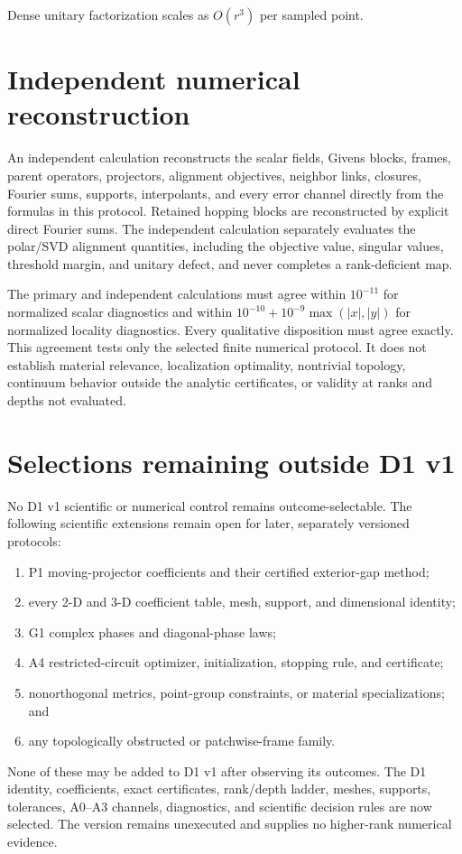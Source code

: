 \documentclass[11pt]{article}
\begin{document}
Dense unitary factorization scales as $O(r^3)$ per sampled point.

\section{Independent numerical reconstruction}

An independent calculation reconstructs the scalar fields, Givens blocks, frames,
parent operators, projectors, alignment objectives, neighbor links, closures, Fourier
sums, supports, interpolants, and every error channel directly from the formulas in this
protocol. Retained hopping blocks are reconstructed by explicit direct Fourier sums.
The independent calculation separately evaluates the polar/SVD alignment quantities,
including the objective value, singular values, threshold margin, and unitary defect,
and never completes a rank-deficient map.

The primary and independent calculations must agree within $10^{-11}$ for normalized
scalar diagnostics and within $10^{-10}+10^{-9}\max(|x|,|y|)$ for normalized locality
diagnostics. Every qualitative disposition must agree exactly. This agreement tests only
the selected finite numerical protocol. It does not establish material relevance,
localization optimality, nontrivial topology, continuum behavior outside the analytic
certificates, or validity at ranks and depths not evaluated.

\section{Selections remaining outside D1 v1}

No D1 v1 scientific or numerical control remains outcome-selectable. The following
scientific extensions remain open for later, separately versioned protocols:

\begin{enumerate}
\item P1 moving-projector coefficients and their certified exterior-gap method;
\item every 2-D and 3-D coefficient table, mesh, support, and dimensional identity;
\item G1 complex phases and diagonal-phase laws;
\item A4 restricted-circuit optimizer, initialization, stopping rule, and certificate;
\item nonorthogonal metrics, point-group constraints, or material specializations; and
\item any topologically obstructed or patchwise-frame family.
\end{enumerate}

None of these may be added to D1 v1 after observing its outcomes. The D1 identity,
coefficients, exact certificates, rank/depth ladder, meshes, supports, tolerances,
A0--A3 channels, diagnostics, and scientific decision rules are now selected. The
version remains unexecuted and supplies no higher-rank numerical evidence.
\end{document}
